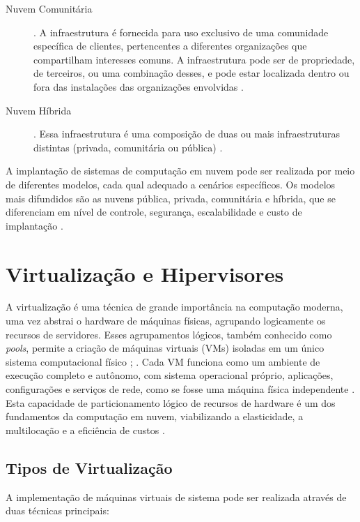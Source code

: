 \begin{description}
    \item[Nuvem Comunitária]. A infraestrutura é fornecida para uso exclusivo de uma comunidade específica de clientes, pertencentes a diferentes organizações que compartilham interesses comuns. A infraestrutura pode ser de propriedade, de terceiros, ou uma combinação desses, e pode estar localizada dentro ou fora das instalações das organizações envolvidas \cite{mell2011}.
    \item[Nuvem Híbrida]. Essa infraestrutura é uma composição de duas ou mais infraestruturas distintas (privada, comunitária ou pública)  \cite{mell2011}.
\end{description}

A implantação de sistemas de computação em nuvem pode ser realizada por meio de diferentes modelos, cada qual adequado a cenários específicos. Os modelos mais difundidos são as nuvens pública, privada, comunitária e híbrida, que se diferenciam em nível de controle, segurança, escalabilidade e custo de implantação \cite{mell2011}.

\section{Virtualização e Hipervisores}
A virtualização é uma técnica de grande importância na computação moderna, uma vez  abstrai o hardware de máquinas físicas, agrupando logicamente os recursos de servidores. Esses agrupamentos lógicos, também conhecido como \textit{pools}, permite a criação de máquinas virtuais (VMs) isoladas em um único sistema computacional físico \cite{carissimi2008}; \cite{kominos2017}. Cada VM funciona como um ambiente de execução completo e autônomo, com sistema operacional próprio, aplicações, configurações e  serviços de rede, como se fosse uma máquina física independente \cite{carissimi2008}. Esta capacidade de particionamento lógico de recursos de hardware é um dos fundamentos da computação em nuvem, viabilizando a elasticidade, a multilocação e a eficiência de custos \cite{chawla2025}.

\subsection{Tipos de Virtualização}
A implementação de máquinas virtuais de sistema pode ser realizada através de duas técnicas principais:

